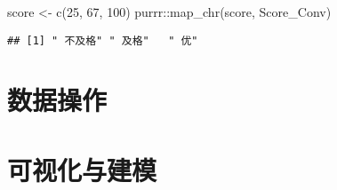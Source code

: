 \documentclass[
]{book}
\newenvironment{Shaded}{\begin{snugshade}}{\end{snugshade}}
\newcommand{\DecValTok}[1]{\textcolor[rgb]{0.00,0.00,0.81}{#1}}
\newcommand{\FunctionTok}[1]{\textcolor[rgb]{0.00,0.00,0.00}{#1}}
\newcommand{\NormalTok}[1]{#1}
\newcommand{\OtherTok}[1]{\textcolor[rgb]{0.56,0.35,0.01}{#1}}
\newcommand{\SpecialCharTok}[1]{\textcolor[rgb]{0.00,0.00,0.00}{#1}}
\begin{document}
\begin{Shaded}
\begin{Highlighting}[]
\NormalTok{score }\OtherTok{\textless{}{-}} \FunctionTok{c}\NormalTok{(}\DecValTok{25}\NormalTok{, }\DecValTok{67}\NormalTok{, }\DecValTok{100}\NormalTok{)}
\NormalTok{purrr}\SpecialCharTok{::}\FunctionTok{map\_chr}\NormalTok{(score, Score\_Conv)}
\end{Highlighting}
\end{Shaded}

\begin{verbatim}
## [1] " 不及格" " 及格"   " 优"
\end{verbatim}

\hypertarget{ux6570ux636eux64cdux4f5c}{%
\chapter{数据操作}\label{ux6570ux636eux64cdux4f5c}}

\hypertarget{ux53efux89c6ux5316ux4e0eux5efaux6a21}{%
\chapter{可视化与建模}\label{ux53efux89c6ux5316ux4e0eux5efaux6a21}}

\hypertarget{section}{%
\section{}\label{section}}

\printbibliography
\end{document}
